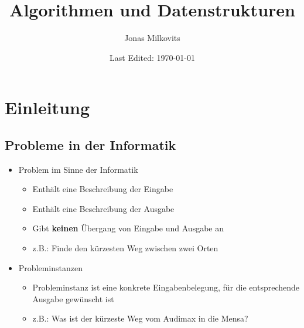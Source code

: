 

\begin{titlepage}
  \title{Algorithmen und Datenstrukturen} %
  \author{Jonas Milkovits}
  \date{Last Edited: \today}
\end{titlepage}



\maketitle
{} %
\tableofcontents
\clearpage
{} %


\section{Einleitung}

\subsection{Probleme in der Informatik}
\begin{itemize}
    \item Problem im Sinne der Informatik
	    \begin{itemize}
          	\item Enthält eine Beschreibung der Eingabe 
          	\item Enthält eine Beschreibung der Ausgabe
          	\item Gibt \textbf{keinen} Übergang von Eingabe und Ausgabe an
          	\item z.B.: Finde den kürzesten Weg zwischen zwei Orten
	    \end{itemize}
	
    \item Probleminstanzen
        \begin{itemize}
          	\item Probleminstanz ist eine konkrete Eingabenbelegung, für die entsprechende Ausgabe gewünscht ist
          	\item z.B.: Was ist der kürzeste Weg vom Audimax in die Mensa?
    	\end{itemize}

\end{itemize}

